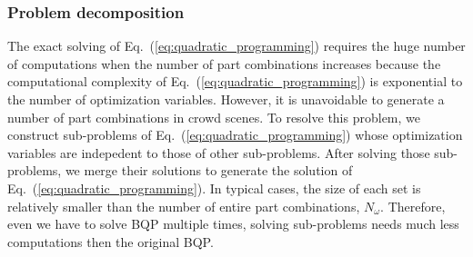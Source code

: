 \documentclass[runningheads]{llncs}
\begin{document}
\subsubsection{Problem decomposition}
\label{subsubsec:problem_decomposition}
The exact solving of Eq.~(\ref{eq:quadratic_programming}) requires the huge number of computations when the number of part combinations increases because the computational complexity of Eq.~(\ref{eq:quadratic_programming}) is exponential to the number of optimization variables.
However, it is unavoidable to generate a number of part combinations in crowd scenes.
To resolve this problem, we construct sub-problems of Eq.~(\ref{eq:quadratic_programming}) whose optimization variables are indepedent to those of other sub-problems.
After solving those sub-problems, we merge their solutions to generate the solution of Eq.~(\ref{eq:quadratic_programming}).
In typical cases, the size of each set is relatively smaller than the number of entire part combinations, $N_{\omega}$.
Therefore, even we have to solve BQP multiple times, solving sub-problems needs much less computations then the original BQP.
\end{document}
